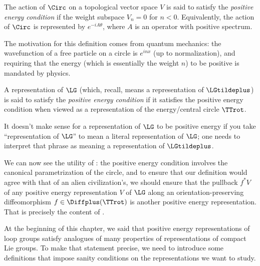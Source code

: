 \begin{definition}
	The action of $\Circ$ on a topological vector space $V$ is said to satisfy the
	\emph{positive energy condition} if the weight subspace $V_n = 0$ for
	$n<0$. Equivalently, the action of $\Circ$ is represented by $e^{-iA\theta}$,
	where $A$ is an operator with positive spectrum.
\end{definition}

\begin{remark}
	The motivation for this definition comes from quantum mechanics: the
	wavefunction of a free particle on a circle is $e^{inx}$ (up to
	normalization), and requiring that the energy (which is essentially the
	weight $n$) to be positive is mandated by physics.
\end{remark}

\begin{definition}
\label{pos_en}
	A representation of $\LG$ (which, recall, means a representation of
	$\LGtildeplus$) is said to satisfy the \emph{positive energy condition} if it
	satisfies the positive energy condition when viewed as a representation of
	the energy/central circle $\TTrot$.
\end{definition}

\begin{remark}
	It doesn't make sense for a representation of $\LG$ to be positive energy if
	you take ``representation of $\LG$'' to mean a literal representation of
	$\LG$; one needs to interpret that phrase as meaning a representation of
	$\LGtildeplus$.
\end{remark}

We can now see the utility of : the positive energy
condition involves the canonical parametrization of the circle, and to ensure that our definition would agree with
that of an alien civilization's, we should ensure that the pullback $f^\ast V$ of any positive energy
representation $V$ of $\LG$ along an orientation-preserving diffeomorphism $f\in \Diffplus(\TTrot)$ is another
positive energy representation. That is precisely the content of .

At the beginning of this chapter, we said that positive energy representations of loop groups satisfy analogues of
many properties of representations of compact Lie groups. To make that statement precise, we need to introduce some
definitions that impose sanity conditions on the representations we want to study.

